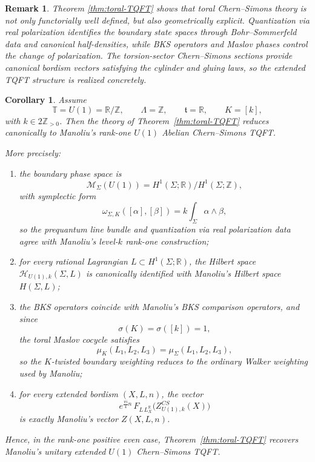 \documentclass[12pt]{amsart}
\numberwithin{equation}{section}
\newtheorem{corollary}[theorem]{Corollary}
\newtheorem*{remark}{Remark}
\begin{document}
\begin{remark}
Theorem \ref{thm:toral-TQFT} shows that toral Chern–Simons theory is not only functorially well defined, but also geometrically explicit. Quantization via real polarization identifies the boundary state spaces through Bohr–Sommerfeld data and canonical half-densities, while BKS operators and Maslov phases control the change of polarization. The torsion-sector Chern–Simons sections provide canonical bordism vectors satisfying the cylinder and gluing laws, so the extended TQFT structure is realized concretely.
\end{remark}

\begin{corollary}
\label{cor:rank-one-recovery}
Assume
\[
\mathbb T=U(1)=\mathbb R/\mathbb Z,\qquad
\Lambda=\mathbb Z,\qquad
\mathfrak t=\mathbb R,\qquad
K=[k],
\]
with \(k\in 2\mathbb Z_{>0}\).
Then the  theory of Theorem~\ref{thm:toral-TQFT} reduces
canonically to Manoliu's rank-one \(U(1)\) Abelian Chern--Simons TQFT.

More precisely:
\begin{enumerate} \renewcommand{\labelenumi}{(\roman{enumi})}
\item the boundary phase space is
\[
\mathcal M_\Sigma(U(1))
=
H^1(\Sigma;\mathbb R)/H^1(\Sigma;\mathbb Z),
\]
with symplectic form
\[
\omega_{\Sigma,K}([\alpha],[\beta])
=
k\int_\Sigma \alpha\wedge\beta,
\]
so the prequantum line bundle and  quantization via real polarization data agree with
Manoliu's level-\(k\) rank-one construction;

\item for every rational Lagrangian \(L\subset H^1(\Sigma;\mathbb R)\), the Hilbert space
\(\mathcal H_{U(1),k}(\Sigma,L)\) is canonically identified with Manoliu's Hilbert space
\(H(\Sigma,L)\);

\item the BKS operators coincide with Manoliu's BKS comparison operators, and since
\[
\sigma(K)=\sigma([k])=1,
\]
the toral Maslov cocycle satisfies
\[
\mu_K(L_1,L_2,L_3)=\mu_\Sigma(L_1,L_2,L_3),
\]
so the \(K\)-twisted boundary weighting reduces to the ordinary Walker weighting used
by Manoliu;

\item for every extended bordism \((X,L,n)\), the vector
\[
e^{\frac{\pi i}{4}n}\,
F_{L\,L_X^{\mathbb R}}\!\bigl(Z^{CS}_{U(1),k}(X)\bigr)
\]
is exactly Manoliu's vector \(Z(X,L,n)\).
\end{enumerate}

Hence, in the rank-one positive even case, Theorem~\ref{thm:toral-TQFT}
recovers Manoliu's unitary extended \(U(1)\) Chern--Simons TQFT.
\end{corollary}
\end{document}
